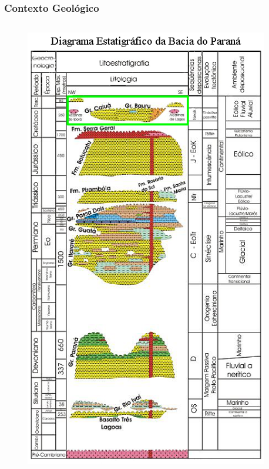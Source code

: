 \documentclass[10pt]{beamer} %
\begin{document}
\begin{frame}
\begin{columns}
\begin{column}{0.75\textwidth}
		\end{column}
		
		
	\end{columns}
\end{frame}	

\begin{frame}
	\frametitle{Contexto Geológico}
	\begin{columns}
		\begin{column}{0.4\textwidth}
			\begin{figure}
				\includegraphics[scale=0.36]{Imagens/diagramabauru.png}
			\end{figure}
		\end{column}
		\begin{column}{0.75\textwidth}

\end{column}
\end{columns}
\end{frame}
\end{document}
